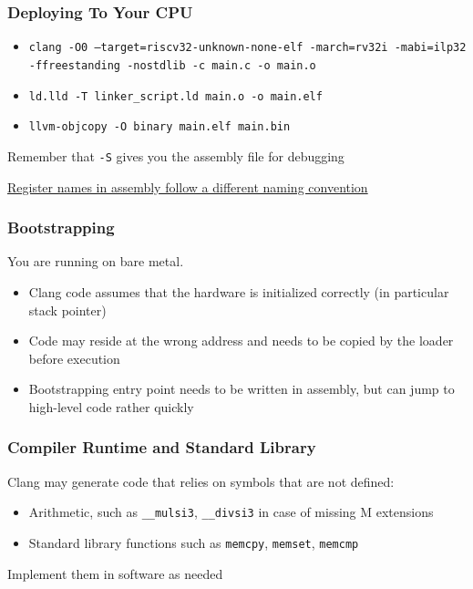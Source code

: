 \documentclass[aspectratio=169]{beamer}
\newif\iftransitions
\newcommand{\cpause}{\iftransitions \pause \fi}
\begin{document}
\begin{frame}

  \frametitle{Deploying To Your CPU}

  \begin{itemize}
    \item \texttt{clang -O0 --target=riscv32-unknown-none-elf -march=rv32i -mabi=ilp32 -ffreestanding -nostdlib -c main.c -o main.o}
    \cpause \vspace{.5em}
    \item \texttt{ld.lld -T linker\_script.ld main.o -o main.elf}
    \cpause \vspace{.5em}
    \item \texttt{llvm-objcopy -O binary main.elf main.bin} \cpause \vspace{1em}
  \end{itemize}

  Remember that \texttt{-S} gives you the assembly file for debugging

  \href{https://docs.riscv.org/reference/abi/v1.0/riscv-cc-register-convention.html}{Register names in assembly follow a different naming convention}

\end{frame}

\begin{frame}

  \frametitle{Bootstrapping}

  You are running on bare metal.

  \begin{itemize}
    \item Clang code assumes that the hardware is initialized correctly (in particular stack pointer)
    \item Code may reside at the wrong address and needs to be copied by the loader before execution
    \item Bootstrapping entry point needs to be written in assembly, but can jump to high-level code rather quickly
  \end{itemize}


\end{frame}

\begin{frame}

  \frametitle{Compiler Runtime and Standard Library}

  Clang may generate code that relies on symbols that are not defined:
  \begin{itemize}
    \item Arithmetic, such as \texttt{\_\_mulsi3}, \texttt{\_\_divsi3} in case of missing M extensions
    \item Standard library functions such as \texttt{memcpy}, \texttt{memset}, \texttt{memcmp}
  \end{itemize}

  Implement them in software as needed

  \vspace{1em}

\end{frame}
\end{document}
